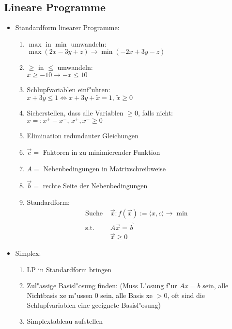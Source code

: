 \documentclass[fleqn,12pt]{scrartcl}
\begin{document}
\subsection{Lineare Programme}
\begin{itemize}
	\item
		Standardform linearer Programme:
		\begin{enumerate}
			\item
				$\max$ in $\min$ umwandeln: \\$\max(2x -3y + z) \rightarrow \min(-2x + 3y - z)$
			\item
				$\geq$ in $\leq$ umwandeln: \\$x \geq -10 \rightarrow -x \leq 10$
			\item
				Schlupfvariablen einf"uhren: \\
				$x+3y \leq 1 \Leftrightarrow x + 3y + \tilde x = 1,\, \tilde x \geq 0$
			\item
				Sicherstellen, dass alle Variablen $\geq 0$, falls nicht:\\
				$x =: x^+ - x^-,\, x^+, x^- \geq 0$
			\item
				Elimination redundanter Gleichungen
			\item
				$\vec c = $ Faktoren in zu minimierender Funktion
			\item
				$A = $ Nebenbedingungen in Matrixschreibweise
			\item
				$\vec b = $ rechte Seite der Nebenbedingungen
			\item
				Standardform:
				\begin{align*}
					\text{Suche } &\vec x: f(\vec x) := \langle x, c \rangle \rightarrow \min\\
					\text{s.t. }& A\vec x = \vec b\\
					&\vec x \geq 0
				\end{align*}
		\end{enumerate}
	\item
		Simplex:
		\begin{enumerate}
			\item
				LP in Standardform bringen
			\item
				Zul"assige Basisl"osung finden: (Muss L"osung f"ur $Ax = b$ sein, alle Nichtbasis xe m"ussen 0 sein, alle Basis xe $> 0$, oft sind die Schlupfvariablen eine geeignete Basisl"osung)
			\item
				Simplextableau aufstellen
				\begin{align*}

\end{align*}
\end{enumerate}
\end{itemize}
\end{document}
